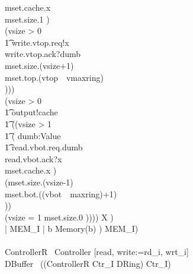 \documentclass[10pt]{article}
\begin{document}
\begin{circus}
                                 mset.cache.x \then \\
                                 mset.size.1 \then \Skip)
                             \\
                             \extchoice 
                             (\lcircguard vsize > 0 \rcircguard \circguard \\
                             \t1
                                 write.vtop.req!x \then \\
                                 write.vtop.ack?dumb \then \\
                                 mset.size.(vsize+1) \then \\
                                 mset.top.(vtop~\mod~vmaxring) \then \\
                                 \Skip))) \\
                        \extchoice
                    (\lcircguard vsize > 0 \rcircguard \circguard \\
                    \t1
                        output!cache \then \\
                        \t1
                            ((\lcircguard vsize > 1 \rcircguard \circguard \\
                                                                \t1
                            (
                            \Intchoice dumb:Value \circspot \\
                            \t1
                            read.vbot.req.dumb \then \\
                            read.vbot.ack?x \then \\
                            mset.cache.x \then \Skip
                            )\circseq\ \\
                            (mset.size.(vsize-1) \then \\
                                    mset.bot.((vbot~\mod~maxring)+1) \then \\
                                    \Skip))
                        \\
                        \extchoice (\lcircguard vsize = 1 \rcircguard 
                                    \circguard mset.size.0 \then \Skip))))
                \circseq X
            ) \\
            \lpar {} | MEM\_I | { b } \rpar Memory(b)
        ) \circhide MEM\_I)
    \\
    \circend
    \\
    \circprocess ControllerR \circdef\ Controller [read, write:=rd\_i, wrt\_i]
    \\
    \circprocess DBuffer \circdef\ ((ControllerR \lpar Ctr\_I \rpar DRing) \circhide Ctr\_I)
\end{circus}%
\end{document}
